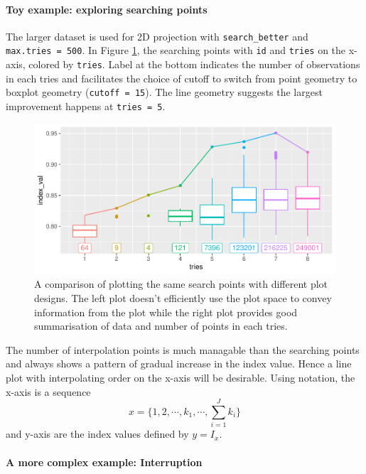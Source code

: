 \documentclass[12pt]{article}
\begin{document}
\hypertarget{toy-example-exploring-searching-points}{%
\paragraph{Toy example: exploring searching
points}\label{toy-example-exploring-searching-points}}

The larger dataset is used for 2D projection with
\texttt{search\_better} and \texttt{max.tries\ =\ 500}. In Figure
\ref{points}, the searching points with \texttt{id} and \texttt{tries}
on the x-axis, colored by \texttt{tries}. Label at the bottom indicates
the number of observations in each tries and facilitates the choice of
cutoff to switch from point geometry to boxplot geometry
(\texttt{cutoff\ =\ 15}). The line geometry suggests the largest
improvement happens at \texttt{tries\ =\ 5}.

\begin{figure}
\centering
\includegraphics{paper_files/figure-latex/points-tries-1.pdf}
\caption{\label{points}A comparison of plotting the same search points
with different plot designs. The left plot doesn't efficiently use the
plot space to convey information from the plot while the right plot
provides good summarisation of data and number of points in each tries.}
\end{figure}

\newpage

The number of interpolation points is much managable than the searching
points and always shows a pattern of gradual increase in the index
value. Hence a line plot with interpolating order on the x-axis will be
desirable. Using notation, the x-axis is a sequence
\[x = \{1, 2, \cdots, k_1, \cdots, \sum_{i=1}^Jk_i\}\] and y-axis are
the index values defined by \(y = I_{x}\).

\hypertarget{a-more-complex-example-interruption}{%
\paragraph{A more complex example:
Interruption}\label{a-more-complex-example-interruption}}
\end{document}
